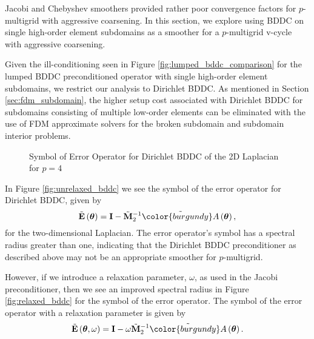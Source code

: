 Jacobi and Chebyshev smoothers provided rather poor convergence factors for $p$-multigrid with aggressive coarsening.
In this section, we explore using BDDC on single high-order element subdomains as a smoother for a $p$-multigrid v-cycle with aggressive coarsening.

Given the ill-conditioning seen in Figure \ref{fig:lumped_bddc_comparison} for the lumped BDDC preconditioned operator with single high-order element subdomains, we restrict our analysis to Dirichlet BDDC.
As mentioned in Section \ref{sec:fdm_subdomain}, the higher setup cost associated with Dirichlet BDDC for subdomains consisting of multiple low-order elements can be eliminated with the use of FDM approximate solvers for the broken subdomain and subdomain interior problems.

\begin{figure}[!ht]
  \centering
  \hfill
  \caption{Symbol of Error Operator for Dirichlet BDDC of the 2D Laplacian for $p = 4$}
\end{figure}

In Figure \ref{fig:unrelaxed_bddc} we see the symbol of the error operator for Dirichlet BDDC, given by
\begin{equation}
\tilde{\mathbf{E}} \left( \boldsymbol{\theta} \right) = \mathbf{I} - \tilde{\mathbf{M}}_2^{-1} \tilde{{\color{burgundy}A}} \left( \boldsymbol{\theta} \right),
\end{equation}
for the two-dimensional Laplacian.
The error operator's symbol has a spectral radius greater than one, indicating that the Dirichlet BDDC preconditioner as described above may not be an appropriate smoother for $p$-multigrid.

However, if we introduce a relaxation parameter, $\omega$, as used in the Jacobi preconditioner, then we see an improved spectral radius in Figure \ref{fig:relaxed_bddc} for the symbol of the error operator.
The symbol of the error operator with a relaxation parameter is given by
\begin{equation}
\tilde{\mathbf{E}} \left( \boldsymbol{\theta}, \omega \right) = \mathbf{I} - \omega \tilde{\mathbf{M}}_2^{-1} \tilde{{\color{burgundy}A}} \left( \boldsymbol{\theta} \right).
\end{equation}

